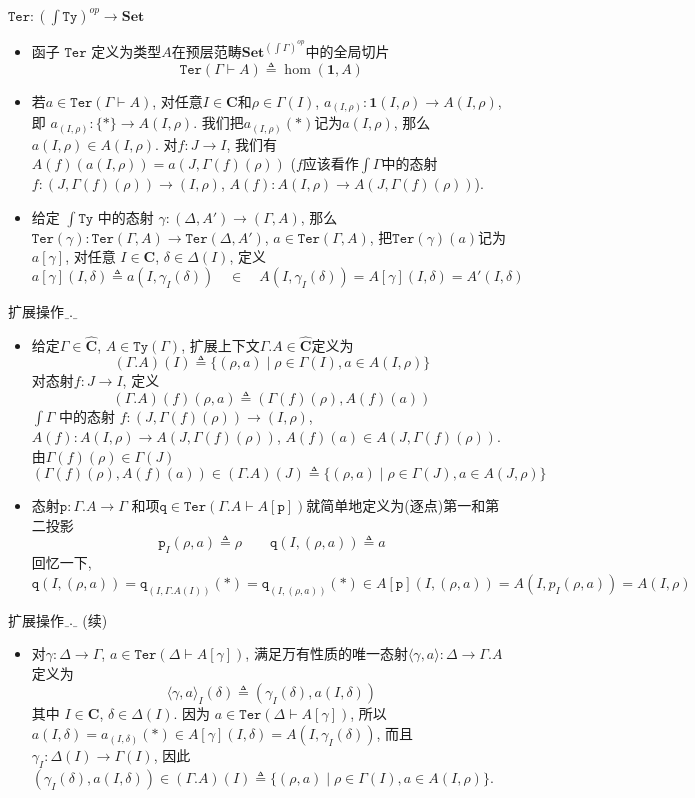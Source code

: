 \documentclass[aspectratio=169,xcolor=dvipsnames]{beamer}
\newcommand\Ty{\mathtt{Ty}}
\newcommand\Ter{\mathtt{Ter}}
\newcommand\ttp{\mathtt{p}}
\newcommand\ttq{\mathtt{q}}
\newcommand\bfone{\mathbf{1}}
\newcommand\Set{\mathbf{Set}}
\newcommand\C{\mathbf{C}}
\newcommand\psC{\widehat{\mathbf{C}}}
\newcommand\extop{{\scalebox{0.4}[1]{\_}}.{\scalebox{0.4}[1]{\_}}}
\begin{document}
\begin{frame}{$\Ter:(\int\Ty)^{op}\to\Set$}
\begin{itemize}
  \item 函子 $\Ter$ 定义为类型$A$在预层范畴$\Set^{(\int\Gamma)^{op}}$中的全局切片\[\Ter(\Gamma\vdash A)\triangleq\hom(\bfone,A) \]
  \item 若$a\in\Ter(\Gamma\vdash A)$, 对任意$I\in\C$和$\rho\in\Gamma(I)$, $a_{(I,\rho)}:\bfone(I,\rho) \to A(I,\rho)$, 即 $a_{(I,\rho)}:\{\ast\} \to A(I,\rho)$. 我们把$a_{(I,\rho)}(\ast)$记为$a(I,\rho)$, 那么 $a(I,\rho)\in A(I,\rho)$. 对$f:J\to I$, 我们有$A(f)(a(I,\rho))=a(J,\Gamma(f)(\rho))$ ($f$应该看作$\int\Gamma$中的态射$f:(J,\Gamma(f)(\rho))\to(I,\rho)$, $A(f):A(I,\rho)\to A(J,\Gamma(f)(\rho))$).
  \item 给定 $\int\Ty$ 中的态射 $\gamma:(\Delta,A')\to(\Gamma,A)$, 那么 $\Ter(\gamma):\Ter(\Gamma,A)\to\Ter(\Delta,A')$, $a\in\Ter(\Gamma,A)$, 把$\Ter(\gamma)(a)$记为$a[\gamma]$, 对任意 $I\in\C$, $\delta\in\Delta(I)$, 定义
  \[ a[\gamma](I,\delta)\triangleq a(I,\gamma_{I}(\delta))\quad\in\quad A(I,\gamma_{I}(\delta))=A[\gamma](I,\delta)=A'(I,\delta) \]
\end{itemize}
\end{frame}

\begin{frame}{扩展操作$\extop$}
  \begin{itemize}
    \item 给定$\Gamma\in\psC$, $A\in\Ty(\Gamma)$, 扩展上下文$\Gamma.A\in\psC$定义为\[ (\Gamma.A)(I)\triangleq\{ (\rho,a)\mid\rho\in\Gamma(I), a\in A(I,\rho)\} \]
    对态射$f:J\to I$, 定义
    \[ (\Gamma.A)(f)(\rho,a)\triangleq (\Gamma(f)(\rho),A(f)(a)) \]
    $\int\Gamma$ 中的态射 $f:(J,\Gamma(f)(\rho))\to(I,\rho)$, $A(f):A(I,\rho)\to A(J,\Gamma(f)(\rho))$, $A(f)(a)\in A(J,\Gamma(f)(\rho))$. 由$\Gamma(f)(\rho)\in\Gamma(J)$
    \[ (\Gamma(f)(\rho),A(f)(a)) \in (\Gamma.A)(J) \triangleq \{ (\rho,a)\mid\rho\in\Gamma(J),a\in A(J,\rho) \} \]
    \item 态射$\ttp:\Gamma.A\to\Gamma$ 和项$\ttq\in\Ter(\Gamma.A\vdash A[\ttp])$就简单地定义为(逐点)第一和第二投影
    \[ \ttp_{I}(\rho,a)\triangleq \rho \qquad \ttq(I,(\rho,a))\triangleq a \]
    回忆一下, $\ttq(I,(\rho,a)) = \ttq_{(I,\Gamma.A(I))}(\ast) = \ttq_{(I,(\rho,a))}(\ast) \in A[\ttp](I,(\rho,a))=A(I,p_{I}(\rho,a))=A(I,\rho)$
  \end{itemize}
\end{frame}

\begin{frame}{扩展操作$\extop$ (续)}
\begin{itemize}
\item 对$\gamma:\Delta\to\Gamma$, $a\in\Ter(\Delta\vdash A[\gamma])$, 满足万有性质的唯一态射$\langle\gamma,a\rangle:\Delta\to\Gamma.A$定义为
\[ \langle\gamma,a\rangle_{I}(\delta)\triangleq(\gamma_{I}(\delta),a(I,\delta)) \]
其中 $I\in\C$, $\delta\in\Delta(I)$. 因为 $a\in\Ter(\Delta\vdash A[\gamma])$, 所以 $a(I,\delta) = a_{(I,\delta)}(\ast)\in A[\gamma](I,\delta)=A(I,\gamma_{I}(\delta))$, 而且 $\gamma_{I} : \Delta(I) \to \Gamma(I)$, 因此 $(\gamma_{I}(\delta),a(I,\delta))\in(\Gamma.A)(I)\triangleq\{ (\rho,a)\mid\rho\in\Gamma(I), a\in A(I,\rho)\}$.
\end{itemize}
\end{frame}
\end{document}
